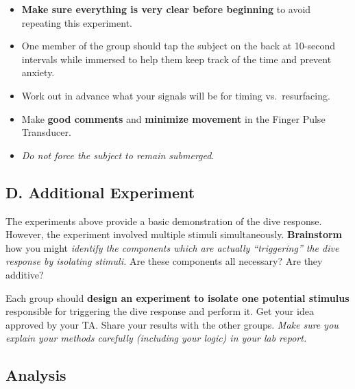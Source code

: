 \documentclass[
  letterpaper,
  DIV=11,
  numbers=noendperiod,
  oneside]{scrartcl}
\providecommand{\tightlist}{%
  \setlength{\itemsep}{0pt}\setlength{\parskip}{0pt}}\usepackage{longtable,booktabs,array}
\begin{document}
\begin{tcolorbox}[enhanced jigsaw, arc=.35mm, leftrule=.75mm, coltitle=black, left=2mm, rightrule=.15mm, colbacktitle=quarto-callout-note-color!10!white, opacitybacktitle=0.6, breakable, titlerule=0mm, colback=white, bottomrule=.15mm, toprule=.15mm, opacityback=0, colframe=quarto-callout-note-color-frame, toptitle=1mm, title=\textcolor{quarto-callout-note-color}{\faInfo}\hspace{0.5em}{NOTES:}, bottomtitle=1mm]

\begin{itemize}
\tightlist
\item
  \textbf{Make sure everything is very clear before beginning} to avoid
  repeating this experiment.
\item
  One member of the group should tap the subject on the back at
  10-second intervals while immersed to help them keep track of the time
  and prevent anxiety.
\item
  Work out in advance what your signals will be for timing
  vs.~resurfacing.
\item
  Make \textbf{good comments} and \textbf{minimize movement} in the
  Finger Pulse Transducer.
\item
  \emph{Do not force the subject to remain submerged}.\\
\end{itemize}

\end{tcolorbox}

\hypertarget{d.-additional-experiment}{%
\subsection{D. Additional Experiment}\label{d.-additional-experiment}}

The experiments above provide a basic demonstration of the dive
response. However, the experiment involved multiple stimuli
simultaneously. \textbf{Brainstorm} how you might \emph{identify the
components which are actually ``triggering'' the dive response by
isolating stimuli.} Are these components all necessary? Are they
additive?

Each group should \textbf{design an experiment to isolate one potential
stimulus} responsible for triggering the dive response and perform it.
Get your idea approved by your TA. Share your results with the other
groups. \emph{Make sure you explain your methods carefully (including
your logic) in your lab report.}

\hypertarget{analysis-1}{%
\subsection{Analysis}\label{analysis-1}}
\end{document}
